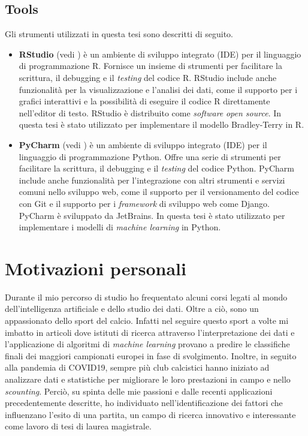 \begin{comment}
library(ggmosaic)
library(ggplot2)
library(gridExtra)
@article{marchiori2020secrets,
	title={Secrets of soccer: Neural network flows and game performance},
	author={Marchiori, Massimo and de Vecchi, Marco},
	journal={Computers \& Electrical Engineering},
	volume={81},
	pages={106505},
	year={2020},
	publisher={Elsevier}
}
\end{comment}

\subsection{Tools}
Gli strumenti utilizzati in questa tesi sono descritti di seguito.
\begin{itemize}
	\item \textbf{RStudio} (vedi \textit{\cite{rstudio}}) è un ambiente di sviluppo integrato (IDE) per il linguaggio di programmazione R. Fornisce un insieme di strumenti per facilitare la scrittura, il debugging e il \emph{testing} del codice R. RStudio include anche funzionalità per la visualizzazione e l'analisi dei dati, come il supporto per i grafici interattivi e la possibilità di eseguire il codice R direttamente nell'editor di testo. RStudio è distribuito come \emph{software} \emph{open source}. In questa tesi è stato utilizzato per implementare il modello Bradley-Terry in R.
	\item \textbf{PyCharm} (vedi \textit{\cite{pycharm}}) è un ambiente di sviluppo integrato (IDE) per il linguaggio di programmazione Python. Offre una serie di strumenti per facilitare la scrittura, il debugging e il \emph{testing} del codice Python. PyCharm include anche funzionalità per l'integrazione con altri strumenti e servizi comuni nello sviluppo web, come il supporto per il versionamento del codice con Git e il supporto per i \emph{framework} di sviluppo web come Django. PyCharm  è sviluppato da JetBrains. In questa tesi è stato utilizzato per implementare i modelli di \emph{machine learning} in Python.
\end{itemize}

\section{Motivazioni personali}
Durante il mio percorso di studio ho frequentato alcuni corsi legati al mondo dell'intelligenza artificiale e dello studio dei dati. Oltre a ciò, sono un appassionato dello sport del calcio. Infatti nel seguire questo sport a volte mi imbatto in articoli dove istituti di ricerca attraverso l'interpretazione dei dati e l'applicazione di algoritmi di \emph{machine learning} provano a predire le classifiche finali dei maggiori campionati europei in fase di svolgimento. Inoltre, in seguito alla pandemia di COVID19, sempre più club calcistici hanno iniziato ad analizzare dati e statistiche per migliorare le loro prestazioni in campo e nello \emph{scounting}. Perciò, su spinta delle mie passioni e dalle recenti applicazioni precedentemente descritte, ho individuato nell'identificazione dei fattori che influenzano l'esito di una partita, un campo di ricerca innovativo e interessante come lavoro di tesi di laurea magistrale.
